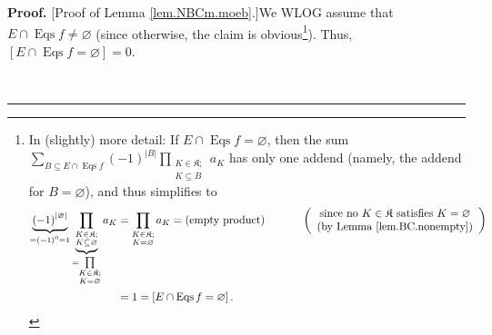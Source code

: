 \documentclass[numbers=enddot,12pt,final,onecolumn,notitlepage]{scrartcl}%
\theoremstyle{definition}
\newenvironment{proof}[1][Proof]{\noindent\textbf{#1.} }{\ \rule{0.5em}{0.5em}}
\newenvironment{vershort}{}{}
\let\sumnonlimits\sum
\let\prodnonlimits\prod
\renewcommand{\sum}{\sumnonlimits\limits}
\renewcommand{\prod}{\prodnonlimits\limits}
\begin{document}
\begin{vershort}
\begin{proof}
[Proof of Lemma \ref{lem.NBCm.moeb}.]We WLOG assume that $E\cap
\operatorname*{Eqs}f\neq\varnothing$ (since otherwise, the claim is
obvious\footnote{In (slightly) more detail: If $E\cap\operatorname*{Eqs}%
f=\varnothing$, then the sum $\sum_{B\subseteq E\cap\operatorname*{Eqs}%
f}\left(  -1\right)  ^{\left\vert B\right\vert }\prod_{\substack{K\in
\mathfrak{K};\\K\subseteq B}}a_{K}$ has only one addend (namely, the addend
for $B=\varnothing$), and thus simplifies to
\begin{align*}
\underbrace{\left(  -1\right)  ^{\left\vert \varnothing\right\vert }%
}_{=\left(  -1\right)  ^{0}=1}\underbrace{\prod_{\substack{K\in\mathfrak{K}%
;\\K\subseteq\varnothing}}}_{=\prod_{\substack{K\in\mathfrak{K}%
;\\K=\varnothing}}}a_{K}  &  =\prod_{\substack{K\in\mathfrak{K}%
;\\K=\varnothing}}a_{K}=\left(  \text{empty product}\right)
\ \ \ \ \ \ \ \ \ \ \left(
\begin{array}
[c]{c}%
\text{since no }K\in\mathfrak{K}\text{ satisfies }K=\varnothing\\
\text{(by Lemma \ref{lem.BC.nonempty})}%
\end{array}
\right) \\
&  =1=\left[  E\cap\operatorname*{Eqs}f=\varnothing\right]  .
\end{align*}
}). Thus, $\left[  E\cap\operatorname*{Eqs}f=\varnothing\right]  =0$.


\end{proof}
\end{vershort}
\end{document}
